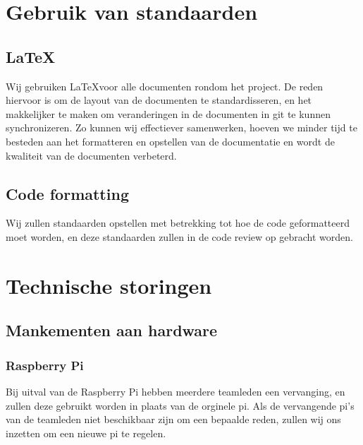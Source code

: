 \section{Gebruik van standaarden}
	\subsection{\LaTeX}
		Wij gebruiken \LaTeX voor alle documenten rondom het project.
		De reden hiervoor is om de layout van de documenten te standardisseren, en het makkelijker te maken om veranderingen in de documenten in git te kunnen synchronizeren.
		Zo kunnen wij effectiever samenwerken, hoeven we minder tijd te besteden aan het formatteren en opstellen van de documentatie en wordt de kwaliteit van de documenten verbeterd.
	\subsection{Code formatting}
		 Wij zullen standaarden opstellen met betrekking tot hoe de code geformatteerd moet worden, en deze standaarden zullen in de code review op gebracht worden.

\section{Technische storingen}
	\subsection{Mankementen aan hardware}
		\subsubsection{Raspberry Pi}
			Bij uitval van de Raspberry Pi hebben meerdere teamleden een vervanging, en zullen deze gebruikt worden in plaats van de orginele pi.
			Als de vervangende pi's van de teamleden niet beschikbaar zijn om een bepaalde reden, zullen wij ons inzetten om een nieuwe pi te regelen.
